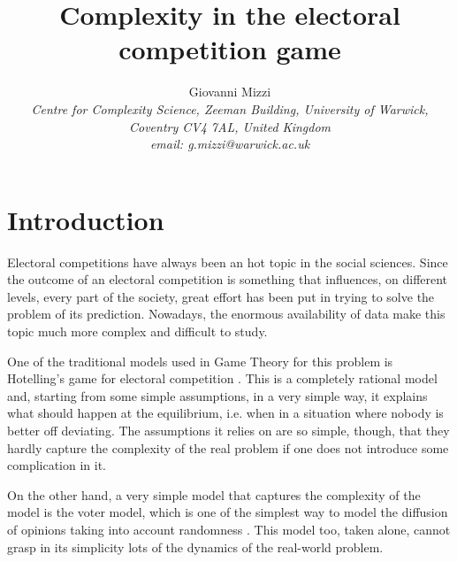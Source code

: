 \documentclass[11pt,a4paper,twocolumn]{article}
\author{Giovanni Mizzi\\ 
\small \textit{Centre for Complexity Science, Zeeman Building, University of Warwick,} \\
\small \textit{Coventry CV4 7AL, United Kingdom}\\ 
\small \textit{email: g.mizzi@warwick.ac.uk}}
\title{\Huge Complexity in the electoral competition game}
\date{}
\begin{document}
\vspace{-10pt}
\section{Introduction}
\vspace{-10pt}
Electoral competitions have always been an hot topic in the social sciences. Since the outcome of an electoral competition is something that influences, on different levels, every part of the society, great effort has been put in trying to solve the problem of its prediction.
Nowadays, the enormous availability of data make this topic much more complex and difficult to study. 

One of the traditional models used in Game Theory for this problem is Hotelling's game for electoral competition \citep{Hotelling1929}. This is a completely rational model and, starting from some simple assumptions, in a very simple way, it explains what should happen at the equilibrium, i.e. when in a situation where nobody is better off deviating. The assumptions it relies on are so simple, though, that they hardly capture the complexity of the real problem if one does not introduce some complication in it.

On the other hand, a very simple model that captures the complexity of the model is the voter model, which is one of the simplest way to model the diffusion of opinions taking into account randomness \citep{Clifford1973}. This model too, taken alone, cannot grasp in its simplicity lots of the dynamics of the real-world problem.
\end{document}
